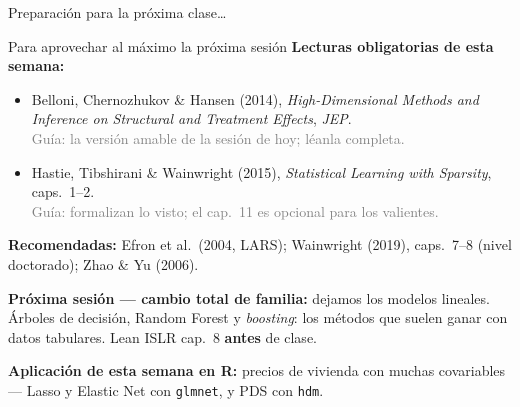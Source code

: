 \documentclass{beamer}
\newcommand{\1}{\mathbb{I}}
\begin{document}
\begin{frame}
\vspace{2.0cm}
\Large{Preparación para la próxima clase\ldots}
\end{frame}


\begin{frame}{Para aprovechar al máximo la próxima sesión}
\small
\textbf{Lecturas obligatorias de esta semana:}
\begin{itemize}\itemsep4pt
  \item Belloni, Chernozhukov \& Hansen (2014), \emph{High-Dimensional Methods and Inference on Structural and Treatment Effects}, \emph{JEP}. \\ \textcolor{gray}{Guía: la versión amable de la sesión de hoy; léanla completa.}
  \item Hastie, Tibshirani \& Wainwright (2015), \emph{Statistical Learning with Sparsity}, caps.\ 1--2. \\ \textcolor{gray}{Guía: formalizan lo visto; el cap.\ 11 es opcional para los valientes.}
\end{itemize}

\textbf{Recomendadas:} Efron et al.\ (2004, LARS); Wainwright (2019), caps.\ 7--8 (nivel doctorado); Zhao \& Yu (2006).
\pause

\vspace{0.2cm}
\textbf{Próxima sesión --- cambio total de familia:} dejamos los modelos lineales. Árboles de decisión, Random Forest y \emph{boosting}: los métodos que suelen ganar con datos tabulares. Lean ISLR cap.\ 8 \textbf{antes} de clase.
\pause

\vspace{0.2cm}
\textbf{Aplicación de esta semana en R:} precios de vivienda con muchas covariables --- Lasso y Elastic Net con \texttt{glmnet}, y PDS con \texttt{hdm}.
\end{frame}
\end{document}
